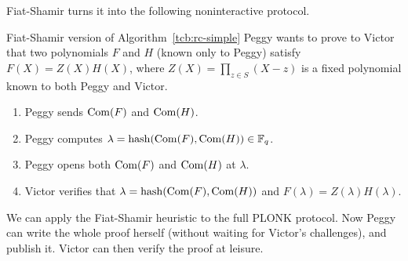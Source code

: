 Fiat-Shamir turns it into the following noninteractive protocol.

\begin{algo}{Fiat-Shamir version of Algorithm~\ref{tcb:rc-simple}}{}
  Peggy wants to prove to Victor that two polynomials $F$ and $H$
  (known only to Peggy) satisfy $F(X) = Z(X)H(X)$, where
  $Z(X) = \prod_{z \in S}(X - z)$ is a fixed polynomial known to both
  Peggy and Victor.

  \begin{enumerate}
  \item Peggy sends $\operatorname{Com}(F)$ and $\operatorname{Com}(H)$.
  \item Peggy computes
    $\lambda = \operatorname{hash}(\operatorname{Com}(F),\operatorname{Com}(H)) \in \mathbb{F}_{q}$.
  \item Peggy opens both $\operatorname{Com}(F)$ and $\operatorname{Com}(H)$ at $\lambda$.
  \item Victor verifies that $\lambda = \operatorname{hash}(\operatorname{Com}(F),\operatorname{Com}(H))$
    and $F(\lambda) = Z(\lambda)H(\lambda)$.
  \end{enumerate}
\end{algo}

We can apply the Fiat-Shamir heuristic to the full PLONK protocol.
Now Peggy can write the whole proof herself
(without waiting for Victor's challenges), and publish it.
Victor can then verify the proof at leisure.
